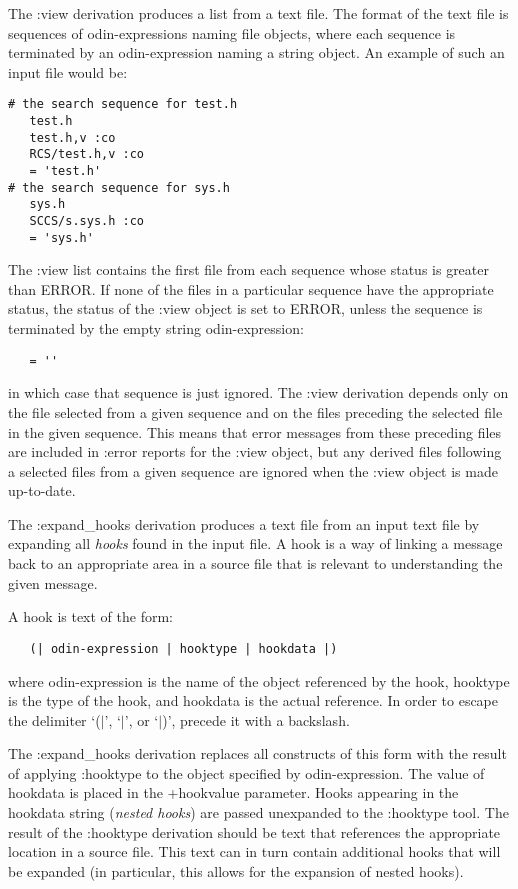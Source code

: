 The {\ex :view} derivation produces a list from a text file.
The format of the text file is sequences of odin-expressions
naming file objects, where each sequence is terminated by
an odin-expression naming a string object.
An example of such an input file would be:
\begin{verbatim}
# the search sequence for test.h
   test.h
   test.h,v :co
   RCS/test.h,v :co
   = 'test.h'
# the search sequence for sys.h
   sys.h
   SCCS/s.sys.h :co
   = 'sys.h'
\end{verbatim}
The {\ex :view} list contains the first file from each sequence
whose status is greater than {\ex ERROR}.
If none of the files in a particular sequence have the appropriate
status, the status of the {\ex :view} object is set to {\ex ERROR},
unless the sequence is terminated by the empty string odin-expression:
\begin{verbatim}
   = ''
\end{verbatim}
in which case that sequence is just ignored.
The {\ex :view} derivation depends only on the file selected
from a given sequence and on the files preceding the
selected file in the given sequence.
This means that error messages from these preceding files
are included in {\ex :error} reports for the {\ex :view} object,
but any derived files following a selected files
from a given sequence are ignored when the {\ex :view}
object is made up-to-date.

The {\ex :expand\_hooks} derivation produces a text file
from an input text file by expanding all {\em hooks} found in the input file.
A hook is a way of linking a message back to an appropriate area
in a source file that is relevant to understanding the given message.

A hook is text of the form:
\begin{verbatim}
   (| odin-expression | hooktype | hookdata |)
\end{verbatim}
where {\ex odin-expression} is the name of the object referenced by the hook,
{\ex hooktype} is the type of the hook, and {\ex hookdata} is the actual
reference.
In order to escape the delimiter `{\ex ($|$}', `{\ex $|$}', or `{\ex $|$)}',
precede it with a backslash.

The {\ex :expand\_hooks} derivation
replaces all constructs of this form with the result of
applying {\ex :hooktype} to the object specified by {\ex odin-expression}.
The value of {\ex hookdata} is placed in the {\ex +hookvalue} parameter.
Hooks appearing in the hookdata string ({\em nested hooks}) are passed
unexpanded to the {\ex :hooktype} tool.
The result of the {\ex :hooktype} derivation should be
text that references the appropriate location in a source file.
This text can in turn contain additional hooks that will be expanded
(in particular, this allows for the expansion of nested hooks).

